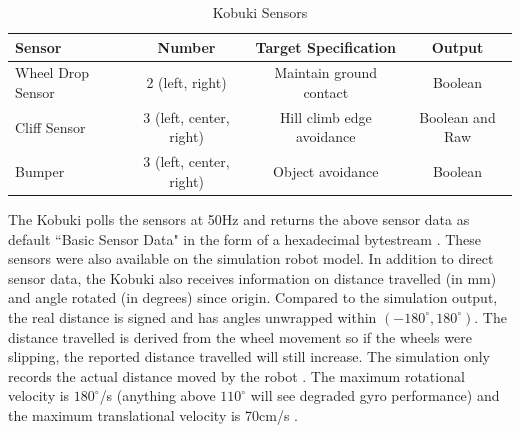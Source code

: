 \begin{table}[H]
\begin{center}
\begin{tabular}{ |l|c|c|c| } 
    \hline
    \textbf{Sensor} & \textbf{Number} & \textbf{Target Specification} & \textbf{Output} \\ 
    \hline
    Wheel Drop Sensor & 2 (left, right) & Maintain ground contact & Boolean\\
    \hline
    Cliff Sensor & 3 (left, center, right) & Hill climb edge avoidance & Boolean and Raw\\
    \hline
    Bumper & 3 (left, center, right) & Object avoidance & Boolean\\
    \hline
\end{tabular}
\caption{Kobuki Sensors} \label{table:kobuki_sensors}
\end{center}
\end{table}
\vspace{-0.5cm}
The Kobuki polls the sensors at 50Hz and returns the above sensor data as default ``Basic Sensor Data" in the form of a hexadecimal bytestream \cite{kobukisensors}. These sensors were also available on the simulation robot model. In addition to direct sensor data, the Kobuki also receives information on distance travelled (in mm) and angle rotated (in degrees) since origin. Compared to the simulation output, the real distance is signed and has angles unwrapped within $(-180^\circ, 180^\circ)$. The distance travelled is derived from the wheel movement so if the wheels were slipping, the reported distance travelled will still increase. The simulation only records the actual distance moved by the robot \cite[p.~37]{labguide}. The maximum rotational velocity is $180^\circ$/s (anything above $110^\circ$ will see degraded gyro performance) and the maximum translational velocity is 70cm/s \cite{kobuki_datasheet}. 

